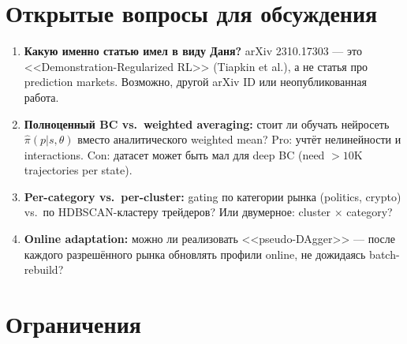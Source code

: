 \documentclass[a4paper, 11pt]{article}
\begin{document}
\section{Открытые вопросы для обсуждения}
\label{sec:questions}

\begin{enumerate}
  \item \textbf{Какую именно статью имел в виду Даня?}
    arXiv 2310.17303 --- это <<Demonstration-Regularized RL>> (Tiapkin et al.),
    а не статья про prediction markets.
    Возможно, другой arXiv ID или неопубликованная работа.

  \item \textbf{Полноценный BC vs.\ weighted averaging:}
    стоит ли обучать нейросеть $\hat{\pi}(p|s, \theta)$
    вместо аналитического weighted mean?
    Pro: учтёт нелинейности и interactions.
    Con: датасет может быть мал для deep BC (need $>10$K trajectories per state).

  \item \textbf{Per-category vs.\ per-cluster:}
    gating по категории рынка (politics, crypto) vs.\ по HDBSCAN-кластеру трейдеров?
    Или двумерное: cluster $\times$ category?

  \item \textbf{Online adaptation:}
    можно ли реализовать <<pseudo-DAgger>> ---
    после каждого разрешённого рынка обновлять профили online,
    не дожидаясь batch-rebuild?
\end{enumerate}

\section{Ограничения}
\label{sec:limitations}
\end{document}
